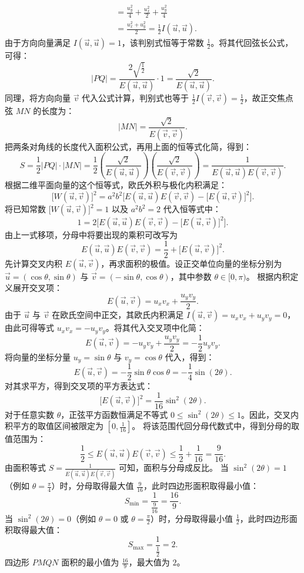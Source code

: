 \begin{solution}
\begin{align*}
&= \frac{u_y^2}{4} + \frac{u_x^2}{2} + \frac{u_y^2}{4} \\
&= \frac{u_x^2 + u_y^2}{2} = \frac{1}{2} I(\vec{u}, \vec{u}).
\end{align*}
由于方向向量满足 $I(\vec{u}, \vec{u}) = 1$，该判别式恒等于常数 $\frac{1}{2}$。将其代回弦长公式，可得：
\[ |PQ| = \frac{2\sqrt{\frac{1}{2}}}{E(\vec{u}, \vec{u})} \cdot 1 = \frac{\sqrt{2}}{E(\vec{u}, \vec{u})}. \]
同理，将方向向量 $\vec{v}$ 代入公式计算，判别式也等于 $\frac{1}{2} I(\vec{v}, \vec{v}) = \frac{1}{2}$，故正交焦点弦 $MN$ 的长度为：
\[ |MN| = \frac{\sqrt{2}}{E(\vec{v}, \vec{v})}. \]
把两条对角线的长度代入面积公式，再用上面的恒等式化简，得到：
\[ S = \frac{1}{2} |PQ| \cdot |MN| = \frac{1}{2} \left( \frac{\sqrt{2}}{E(\vec{u}, \vec{u})} \right) \left( \frac{\sqrt{2}}{E(\vec{v}, \vec{v})} \right) = \frac{1}{E(\vec{u}, \vec{u})E(\vec{v}, \vec{v})}. \]
根据二维平面向量的这个恒等式，欧氏外积与极化内积满足：
\[ \big[W(\vec{u}, \vec{v})\big]^2 = a^2 b^2 \Big[ E(\vec{u}, \vec{u})E(\vec{v}, \vec{v}) - \big[E(\vec{u}, \vec{v})\big]^2 \Big]. \]
将已知常数 $\big[W(\vec{u}, \vec{v})\big]^2 = 1$ 以及 $a^2 b^2 = 2$ 代入恒等式中：
\[ 1 = 2 \Big[ E(\vec{u}, \vec{u})E(\vec{v}, \vec{v}) - \big[E(\vec{u}, \vec{v})\big]^2 \Big]. \]
由上一式移项，分母中将要出现的乘积可改写为
\[ E(\vec{u}, \vec{u})E(\vec{v}, \vec{v}) = \frac{1}{2} + \big[E(\vec{u}, \vec{v})\big]^2. \]
先计算交叉内积 $E(\vec{u}, \vec{v})$，再求面积的极值。设正交单位向量的坐标分别为 $\vec{u} = (\cos\theta, \sin\theta)$ 与 $\vec{v} = (-\sin\theta, \cos\theta)$，其中参数 $\theta \in [0, \pi)$。
根据内积定义展开交叉项：
\[ E(\vec{u}, \vec{v}) = u_x v_x + \frac{u_y v_y}{2}. \]
由于 $\vec{u}$ 与 $\vec{v}$ 在欧氏空间中正交，其欧氏内积满足 $I(\vec{u}, \vec{v}) = u_x v_x + u_y v_y = 0$，由此可得等式 $u_x v_x = -u_y v_y$。将其代入交叉项中化简：
\[ E(\vec{u}, \vec{v}) = -u_y v_y + \frac{u_y v_y}{2} = -\frac{1}{2} u_y v_y. \]
将向量的坐标分量 $u_y = \sin\theta$ 与 $v_y = \cos\theta$ 代入，得到：
\[ E(\vec{u}, \vec{v}) = -\frac{1}{2} \sin\theta \cos\theta = -\frac{1}{4} \sin(2\theta). \]
对其求平方，得到交叉项的平方表达式：
\[ \big[E(\vec{u}, \vec{v})\big]^2 = \frac{1}{16} \sin^2(2\theta). \]
对于任意实数 $\theta$，正弦平方函数恒满足不等式 $0 \le \sin^2(2\theta) \le 1$。因此，交叉内积平方的取值区间被限定为 $\left[0, \frac{1}{16}\right]$。
将该范围代回分母代数式中，得到分母的取值范围为：
\[ \frac{1}{2} \le E(\vec{u}, \vec{u})E(\vec{v}, \vec{v}) \le \frac{1}{2} + \frac{1}{16} = \frac{9}{16}. \]
由面积等式 $S = \frac{1}{E(\vec{u}, \vec{u})E(\vec{v}, \vec{v})}$ 可知，面积与分母成反比。
当 $\sin^2(2\theta) = 1$（例如 $\theta = \frac{\pi}{4}$）时，分母取得最大值 $\frac{9}{16}$，此时四边形面积取得最小值：
\[ S_{\min} = \frac{1}{\frac{9}{16}} = \frac{16}{9}. \]
当 $\sin^2(2\theta) = 0$（例如 $\theta = 0$ 或 $\theta = \frac{\pi}{2}$）时，分母取得最小值 $\frac{1}{2}$，此时四边形面积取得最大值：
\[ S_{\max} = \frac{1}{\frac{1}{2}} = 2. \]
四边形 $PMQN$ 面积的最小值为 $\frac{16}{9}$，最大值为 $2$。
\end{solution}


